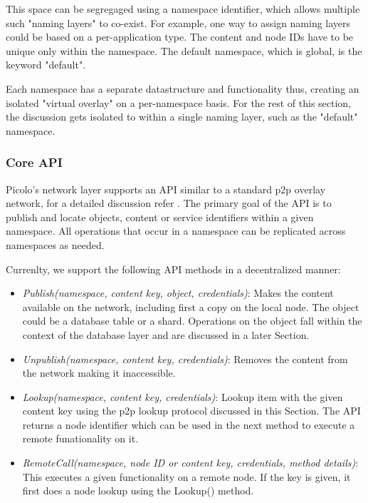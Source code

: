 This space can be segregaged using a namespace identifier, which allows multiple such "naming layers" to co-exist. For
example, one way to assign naming layers could be based on a per-application type. The content and node IDs have to be
unique only within the namespace. The default namespace, which is global, is the keyword "default".

Each namespace has a separate datastructure and functionality thus, creating an isolated "virtual overlay" on a
per-namespace basis. For the rest of this section, the discussion gets isolated to within a single naming layer, such as
the "default" namespace.

\subsubsection{Core API}
\label{net:core_api}
Picolo's network layer supports an API similar to a standard p2p overlay network, for a detailed discussion refer
\cite{dolr2003}. The primary goal of the API is to publish and locate objects, content or service identifiers within a given
namespace. All operations that occur in a namespace can be replicated across namespaces as needed.

Currenlty, we support the following API methods in a decentralized manner:
\begin{itemize}
    \item {\em Publish(namespace, content key, object, credentials)}: Makes the content available on the network, including first a copy on
        the local node. The object could be a database table or a shard. Operations on the object fall within the
        context of the database layer and are discussed in a later Section.
    \item {\em Unpublish(namespace, content key, credentials)}: Removes the content from the network making it inaccessible.
    \item {\em Lookup(namespace, content key, credentials)}: Lookup item with the given content key using the p2p lookup protocol
        discussed in this Section. The API returns a node identifier which can be used in the next method to execute a
        remote funationality on it.
    \item {\em RemoteCall(namespace, node ID or content key, credentials, method details)}: This executes a given functionality
        on a remote node. If the key is given, it first does a node lookup using the Lookup() method.
\end{itemize}

